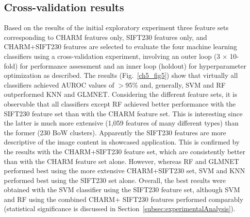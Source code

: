 \subsection{Cross-validation results}
\label{subsec:baselineResults}
Based on the results of the initial exploratory experiment three feature sets corresponding to CHARM features only, SIFT230 features only, and CHARM+SIFT230 features are selected to evaluate the four machine learning classifiers using a cross-validation experiment, involving an outer loop (3 $\times$ 10-fold) for performance assessment and an inner loop (holdout) for hyperparameter optimization as described. The results (Fig.~\ref{ch5_fig5}) show that virtually all classifiers achieved AUROC values of $>$95\% and, generally, SVM and RF outperformed KNN and GLMNET. Considering the different feature sets, it is observable that all classifiers except RF achieved better performance with the SIFT230 feature set than with the CHARM feature set. This is interesting since the latter is much more extensive (1,059 features of many different types) than the former (230 BoW clusters). Apparently the SIFT230 features are more descriptive of the image content in showcased application. This is confirmed by the results with the CHARM+SIFT230 feature set, which are consistently better than with the CHARM feature set alone. However, whereas RF and GLMNET performed best using the more extensive CHARM+SIFT230 set, SVM and KNN performed best using the SIFT230 set alone. Overall, the best results were obtained with the SVM classifier using the SIFT230 feature set, although SVM and RF using the combined CHARM+ SIFT230 features performed comparably (statistical significance is discussed in Section~\ref{subsec:experimentalAnalysis}).
